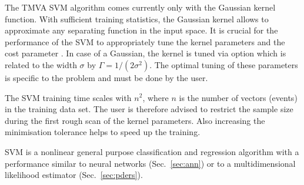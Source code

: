 The TMVA SVM algorithm comes currently only with the Gaussian kernel function.
With sufficient training statistics, the Gaussian kernel allows to approximate 
any separating function in the input space. It is crucial for the performance of the
SVM to appropriately tune the kernel parameters and the cost parameter . 
In case of a Gaussian, the kernel is tuned via option  which is related to 
the width $\sigma$ by $\Gamma=1/(2 \sigma^2)$.
The optimal tuning of these parameters is specific to the problem and must be done by the user. 

The SVM training time scales with $n^2$, where $n$ is the number of vectors (events) in   
the training data set. The user is therefore advised to restrict the sample size
during the first rough scan of the kernel parameters. Also increasing the minimisation
tolerance helps to speed up the training.

SVM is a nonlinear general purpose classification and regression algorithm with 
a performance similar to neural networks (Sec.~\ref{sec:ann}) or to a multidimensional 
likelihood estimator (Sec.~\ref{sec:pders}).
